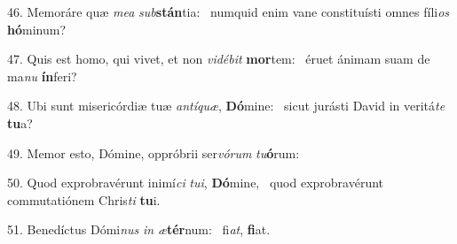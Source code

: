 46. Memoráre quæ \textit{me}\textit{a} \textit{sub}\textbf{stán}tia: \ast\  numquid enim vane constituísti omnes fíli\textit{os} \textbf{hó}minum?\

47. Quis est homo, qui vivet, et non \textit{vi}\textit{dé}\textit{bit} \textbf{mor}tem: \ast\  éruet ánimam suam de ma\textit{nu} \textbf{ín}feri?\

48. Ubi sunt misericórdiæ tuæ \textit{an}\textit{tí}\textit{quæ}, \textbf{Dó}mine: \ast\  sicut jurásti David in veritá\textit{te} \textbf{tu}a?\

49. Memor esto, Dómine, oppróbrii ser\textit{vó}\textit{rum} \textit{tu}\textbf{ó}rum: \ast\  \

50. Quod exprobravérunt inimí\textit{ci} \textit{tu}\textit{i}, \textbf{Dó}mine, \ast\  quod exprobravérunt commutatiónem Chris\textit{ti} \textbf{tu}i.\

51. Benedíctus Dómi\textit{nus} \textit{in} \textit{æ}\textbf{tér}num: \ast\  fi\textit{at}, \textbf{fi}at.\

